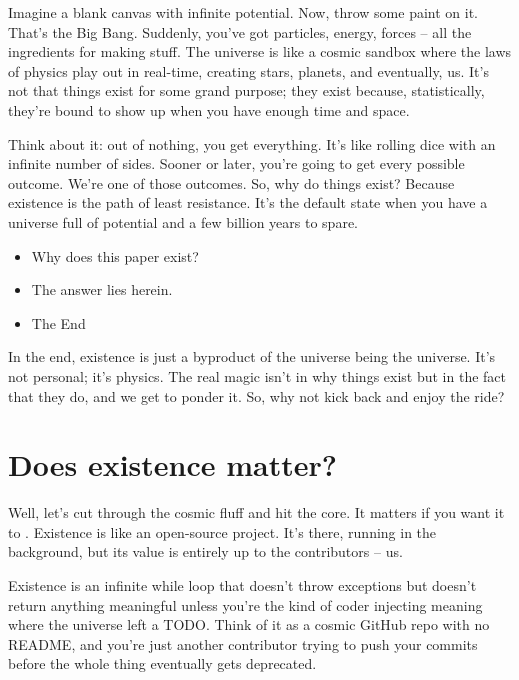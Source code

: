 \documentclass{Axon}
\begin{document}
Imagine a blank canvas with infinite potential. Now, throw some paint on it. That's the Big Bang. Suddenly, you've got particles, energy, forces – all the ingredients for making stuff. The universe is like a cosmic sandbox where the laws of physics play out in real-time, creating stars, planets, and eventually, us. It’s not that things exist for some grand purpose; they exist because, statistically, they’re bound to show up when you have enough time and space.

Think about it: out of nothing, you get everything. It's like rolling dice with an infinite number of sides. Sooner or later, you're going to get every possible outcome. We’re one of those outcomes. So, why do things exist? Because existence is the path of least resistance. It’s the default state when you have a universe full of potential and a few billion years to spare.

\begin{itemize}
    \item Why does this paper exist?
    \item The answer lies herein.
    \item The End
\end{itemize}

In the end, existence is just a byproduct of the universe being the universe. It’s not personal; it’s physics. The real magic isn't in why things exist but in the fact that they do, and we get to ponder it. So, why not kick back and enjoy the ride?
\section{Does existence matter?}
Well, let's cut through the cosmic fluff and hit the core. It matters if you want it to \cite{MALAJETMAROVA2017209}. Existence is like an open-source project. It’s there, running in the background, but its value is entirely up to the contributors – us.

\begin{definition}
Existence is an infinite while loop that doesn't throw exceptions but doesn't return anything meaningful unless you’re the kind of coder injecting meaning where the universe left a TODO. Think of it as a cosmic GitHub repo with no README, and you’re just another contributor trying to push your commits before the whole thing eventually gets deprecated.
\end{definition}
\end{document}
